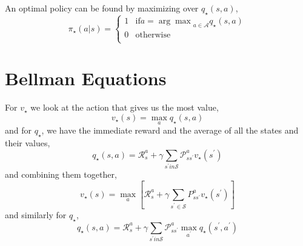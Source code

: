 \documentclass[a4paper,10pt]{article}
\begin{document}
An optimal policy can be found by maximizing over $q_\star(s,a)$, 
$$
\pi_\star(a|s) = 
\begin{cases}
 1 & \mbox{if} a = {\arg\max}_{a \in \mathcal{A}} q_\star(s,a)\\
 0 & \mbox{otherwise} \\
\end{cases}
$$

\section{Bellman Equations}

For $v_\star$ we look at the action that gives us the most value,
$$
v_\star(s) = \max_a q_\star (s, a)
$$
and for $q_\star$, we have the immediate reward and the average of all the states and their values,
$$
q_\star(s,a) = \mathcal{R}_s^a + \gamma \sum_{s^\prime in \mathcal{S}} \mathcal{P}^a_{s s^\prime} v_\star(s^\prime)
$$
and combining them together,
$$
v_\star(s) = \max_a \left[ \mathcal{R}_s^a + \gamma \sum_{s^\prime \in \mathcal{S}} P^a_{s s^\prime} v_\star(s^\prime) \right]
$$
and similarly for $q_\star$, 
$$
q_\star(s,a) = \mathcal{R}_s^a + \gamma \sum_{s^\prime in \mathcal{S}} \mathcal{P}^a_{s s^\prime} \max_{a^\prime} q_\star(s^\prime, a^\prime)
$$
\end{document}
